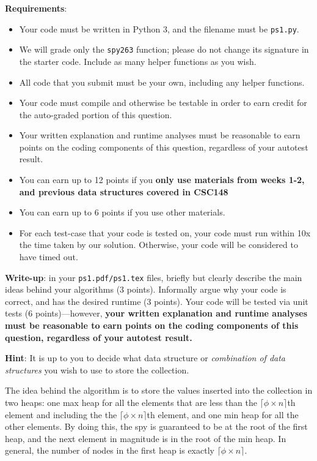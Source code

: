 \documentclass{assignment-263}
\begin{document}
\begin{enumerate}
\textbf{Requirements}:
\begin{itemize}
\item Your code must be written in Python 3, and the filename must be \verb|ps1.py|.
\item We will grade only the \verb|spy263| function;
      please do not change its signature in the starter code.
      Include as many helper functions as you wish.
\item All code that you submit must be your own, including any helper functions.
\item Your code must compile and otherwise be testable in order to earn credit
      for the auto-graded portion of this question.
\item Your written explanation and runtime analyses must be reasonable to earn points
      on the coding components of this question, regardless of your autotest result.
\item You can earn up to 12 points if you \textbf{only use materials from weeks 1-2, and previous data structures covered in CSC148}
\item You can earn up to 6 points if you use other materials.
\item For each test-case that your code is tested on, your code must run within
10x the time taken by our solution. Otherwise, your code will be considered to have timed out.
\end{itemize}

\textbf{Write-up}: in your \verb|ps1.pdf/ps1.tex| files, briefly 
but clearly describe the main ideas behind your algorithms (3 points).
Informally argue why your code is correct, and has the desired runtime (3 points).
Your code will be tested via unit tests (6 points)---however, 
\textbf{your written explanation and runtime analyses must be reasonable to earn points
on the coding components of this question, regardless of your autotest result.}

\textbf{Hint}: It is up to you to decide what data structure or
\textit{combination of data structures} you wish to use to store the collection.


\end{enumerate}

The idea behind the algorithm is to store the values inserted into the collection in two heaps: one max heap for all the elements that are less than the \(\lceil \phi \times n \rceil\)th element and including the the \(\lceil \phi \times n \rceil\)th element, and one min heap for all the other elements. By doing this, the spy is guaranteed to be at the root of the first heap, and the next element in magnitude is in the root of the min heap. In general, the number of nodes in the first heap is exactly \(\lceil \phi \times n \rceil\).
\end{document}
